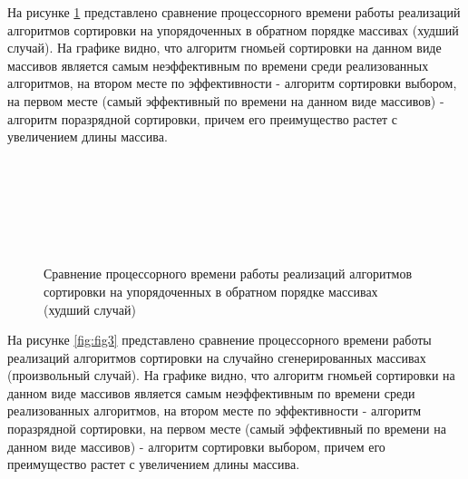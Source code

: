 \FloatBarrier
На рисунке \ref{fig:fig2} представлено сравнение процессорного времени работы реализаций алгоритмов сортировки на упорядоченных в обратном порядке массивах (худший случай). На графике видно, что алгоритм гномьей сортировки на данном виде массивов является самым неэффективным по времени среди реализованных алгоритмов, на втором месте по эффективности - алгоритм сортировки выбором, на первом месте (самый эффективный по времени на данном виде массивов) - алгоритм поразрядной сортировки, причем его преимущество растет с увеличением длины массива.
\\
\\
\\
\\
\\
\\
\\

\begin{figure}[h!]
	
	
	\caption{Сравнение процессорного времени работы реализаций алгоритмов сортировки на упорядоченных в обратном порядке массивах (худший случай)}
	
	\label{fig:fig2}
	
\end{figure}

\FloatBarrier
На рисунке \ref{fig:fig3} представлено сравнение процессорного времени работы реализаций алгоритмов сортировки на случайно сгенерированных массивах (произвольный случай).
На графике видно, что алгоритм гномьей сортировки на данном виде массивов является самым неэффективным по времени среди реализованных алгоритмов,  на втором месте по эффективности - алгоритм поразрядной сортировки, на первом месте (самый эффективный по времени на данном виде массивов) - алгоритм сортировки выбором, причем его преимущество растет с увеличением длины массива.
\\
\\
\\
\\
\\
\\


